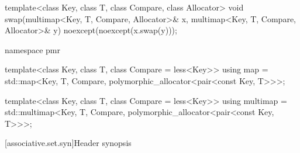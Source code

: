 \begin{codeblock}
{  template<class Key, class T, class Compare, class Allocator>
    void swap(multimap<Key, T, Compare, Allocator>& x,
              multimap<Key, T, Compare, Allocator>& y)
      noexcept(noexcept(x.swap(y)));

  namespace pmr {
    template<class Key, class T, class Compare = less<Key>>
      using map = std::map<Key, T, Compare,
                           polymorphic_allocator<pair<const Key, T>>>;

    template<class Key, class T, class Compare = less<Key>>
      using multimap = std::multimap<Key, T, Compare,
                                     polymorphic_allocator<pair<const Key, T>>>;
  }
}
\end{codeblock}

[associative.set.syn]{Header  synopsis}%

%

